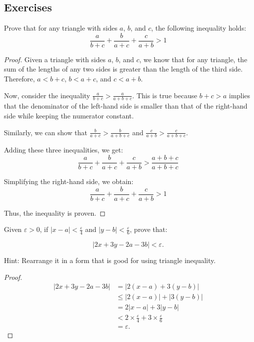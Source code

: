 \subsection{Exercises}
\begin{exercise}
    Prove that for any triangle with sides \(a\), \(b\), and \(c\), the following inequality holds:
\[ \frac{a}{b + c} + \frac{b}{a + c} + \frac{c}{a + b} > 1 \]
\end{exercise}
\begin{proof}

Given a triangle with sides \(a\), \(b\), and \(c\), we know that for any triangle, the sum of the lengths of any two sides is greater than the length of the third side. Therefore, \(a < b + c\), \(b < a + c\), and \(c < a + b\).

Now, consider the inequality \(\frac{a}{b + c} > \frac{a}{a + b + c}\). This is true because \(b + c > a\) implies that the denominator of the left-hand side is smaller than that of the right-hand side while keeping the numerator constant.

Similarly, we can show that \(\frac{b}{a + c} > \frac{b}{a + b + c}\) and \(\frac{c}{a + b} > \frac{c}{a + b + c}\).

Adding these three inequalities, we get:
\[ \frac{a}{b + c} + \frac{b}{a + c} + \frac{c}{a + b} > \frac{a + b + c}{a + b + c} \]

Simplifying the right-hand side, we obtain:
\[ \frac{a}{b + c} + \frac{b}{a + c} + \frac{c}{a + b} > 1 \]

Thus, the inequality is proven. 

\end{proof}

\begin{exercise}
    Given $\varepsilon > 0$, if $|x - a| < \frac{\varepsilon}{4}$ and $|y - b| < \frac{\varepsilon}{6}$, prove that:

\[
|2x + 3y - 2a - 3b| < \varepsilon.
\]
\end{exercise}
Hint: Rearrange it in a form that is good for using triangle inequality.
\begin{proof}
    \begin{align*}
        |2x + 3y - 2a - 3b| &= |2(x - a) + 3(y - b)| \\
        &\leq |2(x - a)| + |3(y - b)| \\
        &= 2|x - a| + 3|y - b| \\
        &< 2 \times \frac{\varepsilon}{4} + 3 \times \frac{\varepsilon}{6} \\
        &= \varepsilon.
        \end{align*}
\end{proof}

